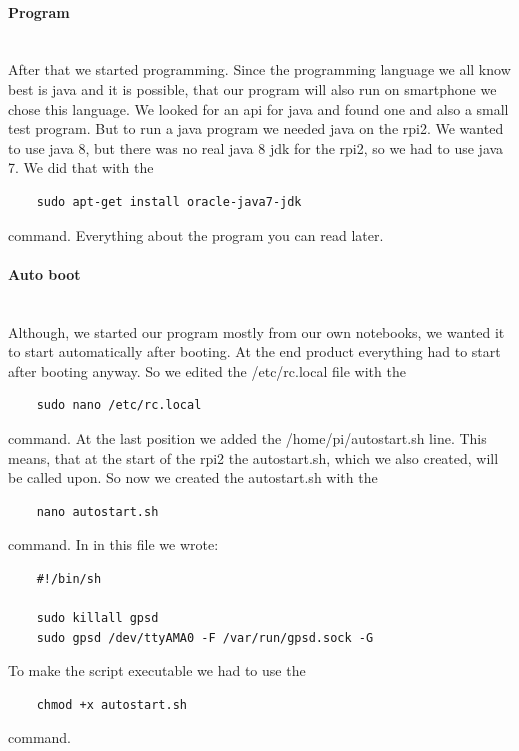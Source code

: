 \paragraph{Program} \mbox{}\\
After that we started programming. Since the programming language we all know best is java and it is possible, that our program will also run on smartphone we chose this language. \newline
We looked for an api for java and found one and also a small test program. \newline
But to run a java program we needed java on the \gls{rpi2}. We wanted to use java 8, but there was no real java 8 jdk for the \gls{rpi2}, so we had to use java 7. We did that with the 
\begin{verbatim}
	sudo apt-get install oracle-java7-jdk
\end{verbatim}
command.\newline
Everything about the program you can read later.

\paragraph{Auto boot} \mbox{}\\
Although, we started our program mostly from our own notebooks, we wanted it to start automatically after booting. At the end product everything had to start after booting anyway. So we edited the /etc/rc.local file with the \begin{verbatim}
	sudo nano /etc/rc.local
\end{verbatim} 
command. At the last position we added the /home/pi/autostart.sh line.\newline
This means, that at the start of the \gls{rpi2} the autostart.sh, which we also created, will be called upon. So now we created the autostart.sh with the 
\begin{verbatim}
	nano autostart.sh
\end{verbatim}
command. In in this file we wrote:
\begin{verbatim}
	#!/bin/sh

	sudo killall gpsd
	sudo gpsd /dev/ttyAMA0 -F /var/run/gpsd.sock -G
\end{verbatim}
To make the script executable we had to use the \begin{verbatim}
	chmod +x autostart.sh
\end{verbatim}
command.

